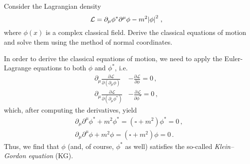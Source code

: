\begin{ex} \label{Ex2} 
	Consider the Lagrangian density
	\begin{equation}
		\mathcal{L} = \partial_\mu \phi^* \partial^\mu \phi - m^2 \abs{\phi}^2 \; ,
	\end{equation}
	where $\phi(x)$ is a complex classical field. Derive the classical equations of motion and solve them using the method of normal coordinates.
\end{ex}


\begin{sol}
	In order to derive the classical equations of motion, we need to apply the Euler-Lagrange equations to both $\phi$ and $\phi^{*}$, i.e.
	\begin{equation}
		\begin{split}
			\partial_{\mu}\frac{\partial \mathcal{L}}{\partial(\partial_{\mu}\phi)} &- \frac{\partial \mathcal{L}}{\partial \phi} =  0 \, ,\\
			\partial_{\mu}\frac{\partial \mathcal{L}}{\partial(\partial_{\mu}\phi^{*})} &- \frac{\partial \mathcal{L}}{\partial \phi^{*}} =  0 \, ,
		\end{split}
	\end{equation}
	which, after computing the derivatives, yield
	\begin{equation}
		\begin{split}
			& \partial_{\mu}\partial^{\mu} \phi^{*} + m^{2}\phi^{*} = (\square + m^{2}) \phi^{*} = 0 \, , \\ 
			& \partial_{\mu}\partial^{\mu} \phi + m^{2}\phi = (\square + m^{2}) \phi = 0 \, .
			\label{eq_ex2_KG_eqs}
		\end{split}
	\end{equation}
	Thus, we find that $\phi$ (and, of course, $\phi^*$ as well) satisfies the so-called \emph{Klein–Gordon equation} (KG). 
	

\end{sol}
